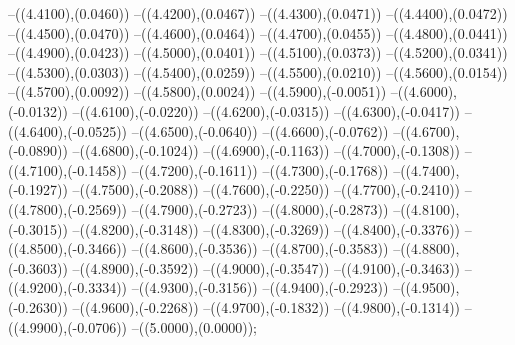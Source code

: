 {	--({\sx*(4.4100)},{\sy*(0.0460)})
	--({\sx*(4.4200)},{\sy*(0.0467)})
	--({\sx*(4.4300)},{\sy*(0.0471)})
	--({\sx*(4.4400)},{\sy*(0.0472)})
	--({\sx*(4.4500)},{\sy*(0.0470)})
	--({\sx*(4.4600)},{\sy*(0.0464)})
	--({\sx*(4.4700)},{\sy*(0.0455)})
	--({\sx*(4.4800)},{\sy*(0.0441)})
	--({\sx*(4.4900)},{\sy*(0.0423)})
	--({\sx*(4.5000)},{\sy*(0.0401)})
	--({\sx*(4.5100)},{\sy*(0.0373)})
	--({\sx*(4.5200)},{\sy*(0.0341)})
	--({\sx*(4.5300)},{\sy*(0.0303)})
	--({\sx*(4.5400)},{\sy*(0.0259)})
	--({\sx*(4.5500)},{\sy*(0.0210)})
	--({\sx*(4.5600)},{\sy*(0.0154)})
	--({\sx*(4.5700)},{\sy*(0.0092)})
	--({\sx*(4.5800)},{\sy*(0.0024)})
	--({\sx*(4.5900)},{\sy*(-0.0051)})
	--({\sx*(4.6000)},{\sy*(-0.0132)})
	--({\sx*(4.6100)},{\sy*(-0.0220)})
	--({\sx*(4.6200)},{\sy*(-0.0315)})
	--({\sx*(4.6300)},{\sy*(-0.0417)})
	--({\sx*(4.6400)},{\sy*(-0.0525)})
	--({\sx*(4.6500)},{\sy*(-0.0640)})
	--({\sx*(4.6600)},{\sy*(-0.0762)})
	--({\sx*(4.6700)},{\sy*(-0.0890)})
	--({\sx*(4.6800)},{\sy*(-0.1024)})
	--({\sx*(4.6900)},{\sy*(-0.1163)})
	--({\sx*(4.7000)},{\sy*(-0.1308)})
	--({\sx*(4.7100)},{\sy*(-0.1458)})
	--({\sx*(4.7200)},{\sy*(-0.1611)})
	--({\sx*(4.7300)},{\sy*(-0.1768)})
	--({\sx*(4.7400)},{\sy*(-0.1927)})
	--({\sx*(4.7500)},{\sy*(-0.2088)})
	--({\sx*(4.7600)},{\sy*(-0.2250)})
	--({\sx*(4.7700)},{\sy*(-0.2410)})
	--({\sx*(4.7800)},{\sy*(-0.2569)})
	--({\sx*(4.7900)},{\sy*(-0.2723)})
	--({\sx*(4.8000)},{\sy*(-0.2873)})
	--({\sx*(4.8100)},{\sy*(-0.3015)})
	--({\sx*(4.8200)},{\sy*(-0.3148)})
	--({\sx*(4.8300)},{\sy*(-0.3269)})
	--({\sx*(4.8400)},{\sy*(-0.3376)})
	--({\sx*(4.8500)},{\sy*(-0.3466)})
	--({\sx*(4.8600)},{\sy*(-0.3536)})
	--({\sx*(4.8700)},{\sy*(-0.3583)})
	--({\sx*(4.8800)},{\sy*(-0.3603)})
	--({\sx*(4.8900)},{\sy*(-0.3592)})
	--({\sx*(4.9000)},{\sy*(-0.3547)})
	--({\sx*(4.9100)},{\sy*(-0.3463)})
	--({\sx*(4.9200)},{\sy*(-0.3334)})
	--({\sx*(4.9300)},{\sy*(-0.3156)})
	--({\sx*(4.9400)},{\sy*(-0.2923)})
	--({\sx*(4.9500)},{\sy*(-0.2630)})
	--({\sx*(4.9600)},{\sy*(-0.2268)})
	--({\sx*(4.9700)},{\sy*(-0.1832)})
	--({\sx*(4.9800)},{\sy*(-0.1314)})
	--({\sx*(4.9900)},{\sy*(-0.0706)})
	--({\sx*(5.0000)},{\sy*(0.0000)});
}
